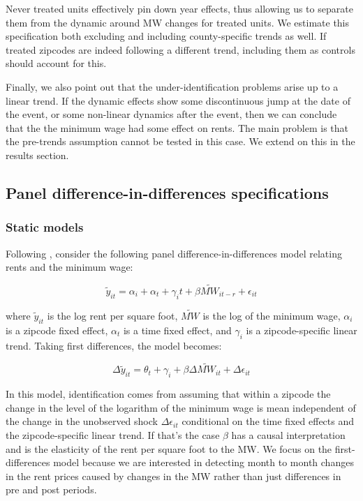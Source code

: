     Never treated units effectively pin down year effects, thus allowing us to separate them from the dynamic around MW changes for treated units. We estimate this specification both excluding and including county-specific trends as well. If treated zipcodes are indeed following a different trend, including them as controls should account for this.
    
    Finally, we also point out that the under-identification problems arise up to a linear trend. If the dynamic effects show some discontinuous jump at the date of the event, or some non-linear dynamics after the event, then we can conclude that the the minimum wage had some effect on rents. The main problem is that the pre-trends assumption cannot be tested in this case. We extend on this in the results section.

\subsection{Panel difference-in-differences specifications} \label{subsec:empirical_strategy/first-difference}

\subsubsection{Static models}

    Following \textcite{meer2016effects}, consider the following panel difference-in-differences model relating rents and the minimum wage:

\begin{equation}\label{eq:diff_main}
        \tilde{y}_{it} = \alpha_i + \alpha_t + \gamma_i t + \beta \tilde{MW}_{it-r} + \epsilon_{it}
\end{equation}
    
    where $\tilde{y}_{it}$ is the log rent per square foot, $\tilde{MW}$ is the log of the minimum wage, $\alpha_i$ is a zipcode fixed effect, $\alpha_t$ is a time fixed effect, and $\gamma_i$ is a zipcode-specific linear trend. Taking first differences, the model becomes:
    
\begin{equation}\label{eq:diff_main}
        \Delta \tilde{y}_{it} = \theta_t + \gamma_i + \beta \Delta \tilde{MW}_{it}+ \Delta \epsilon_{it}
\end{equation}
    
    In this model, identification comes from assuming that within a zipcode the change in the level of the logarithm of the minimum wage is mean independent of the change in the unobserved shock $\Delta \epsilon_{it}$ conditional on the time fixed effects and the zipcode-specific linear trend. If that's the case $\beta$ has a causal interpretation and is the elasticity of the rent per square foot to the MW. We focus on the first-differences model because we are interested in detecting month to month changes in the rent prices caused by changes in the MW rather than just differences in pre and post periods.
    
